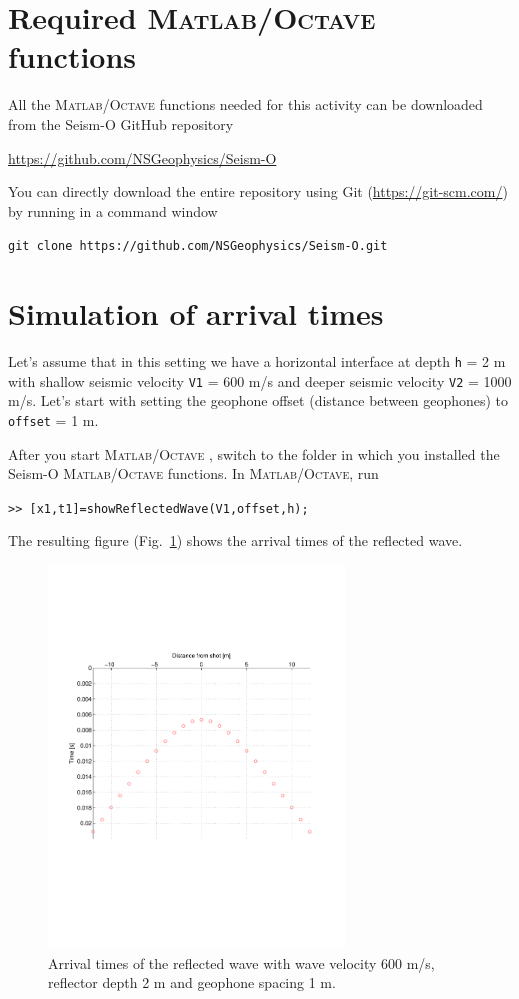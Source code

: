 \documentclass[11pt]{article}
\begin{document}
\section{Required \textsc{Matlab}/\textsc{Octave} functions}
All the \textsc{Matlab}/\textsc{Octave} functions needed for this activity can be
downloaded from the Seism-O GitHub repository

\url{https://github.com/NSGeophysics/Seism-O}

You can directly download the entire repository using Git
(\url{https://git-scm.com/}) by running in a command window

\verb#git clone https://github.com/NSGeophysics/Seism-O.git#

\section{Simulation of arrival times}
Let's assume that in this setting we have a horizontal interface at
depth \verb#h# = 2 m with shallow seismic velocity \verb#V1# = 600 m/s
and deeper seismic velocity \verb#V2# = 1000 m/s. Let's start with
setting the geophone offset (distance between geophones) to
\verb#offset# = 1 m.

After you start \textsc{Matlab}/\textsc{Octave} , switch to the folder in which you
installed the Seism-O \textsc{Matlab}/\textsc{Octave}  functions. In \textsc{Matlab}/\textsc{Octave},
run

\verb#>> [x1,t1]=showReflectedWave(V1,offset,h);#

The resulting figure (Fig.~\ref{arrivalreflect}) shows the arrival
times of the reflected wave.

\begin{figure}
  \centering
  \includegraphics[width=0.7\textwidth, trim = 1cm 7.5cm 2cm
    6cm,clip]{figures/ArrivalReflected.pdf}
  \caption{\label{arrivalreflect} Arrival times of the reflected
    wave with wave velocity 600 m/s, reflector depth 2 m and geophone
    spacing 1 m.}
\end{figure}
\end{document}
